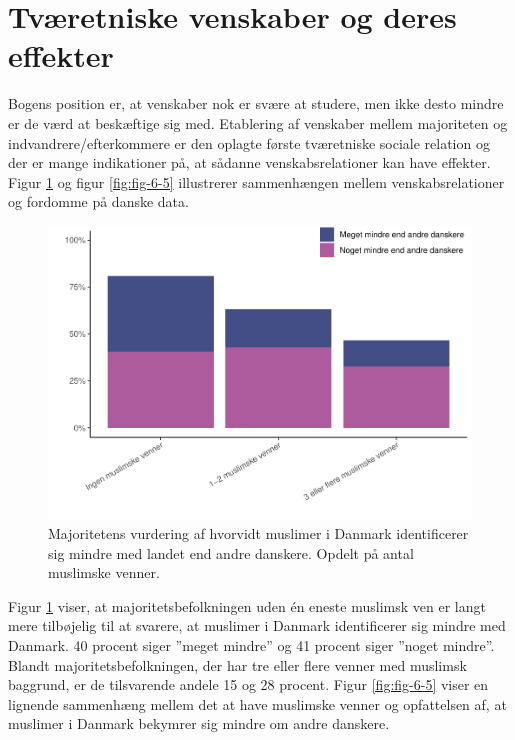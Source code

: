 \documentclass[
]{book}
\begin{document}
\section{Tværetniske venskaber og deres effekter}\label{tvuxe6retniske-venskaber-og-deres-effekter}

Bogens position er, at venskaber nok er svære at studere, men ikke desto mindre er de værd at beskæftige sig med. Etablering af venskaber mellem majoriteten og indvandrere/efterkommere er den oplagte første tværetniske sociale relation og der er mange indikationer på, at sådanne venskabsrelationer kan have effekter. Figur \ref{fig:fig-6-4} og figur \ref{fig:fig-6-5} illustrerer sammenhængen mellem venskabsrelationer og fordomme på danske data.

\begin{figure}
\includegraphics[width=1\linewidth]{en-befolkning-blander-sig_files/figure-latex/fig-6-4-1} \caption{Majoritetens vurdering af hvorvidt muslimer i Danmark identificerer sig mindre med landet end andre danskere. Opdelt på antal muslimske venner.}\label{fig:fig-6-4}
\end{figure}

Figur \ref{fig:fig-6-4} viser, at majoritetsbefolkningen uden én eneste muslimsk ven er langt mere tilbøjelig til at svarere, at muslimer i Danmark identificerer sig mindre med Danmark. 40 procent siger ''meget mindre'' og 41 procent siger ''noget mindre''. Blandt majoritetsbefolkningen, der har tre eller flere venner med muslimsk baggrund, er de tilsvarende andele 15 og 28 procent. Figur \ref{fig:fig-6-5} viser en lignende sammenhæng mellem det at have muslimske venner og opfattelsen af, at muslimer i Danmark bekymrer sig mindre om andre danskere.
\end{document}
